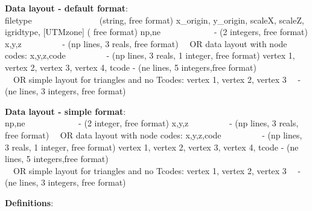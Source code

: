 \documentclass{article}
\begin{document}
\textbf{Data layout - default format}: \\ 

\noindent
filetype\ \ \ \ \ \ \ \ \ \ \ \ \ \ \ \ (string, free format) \newline
x\_origin, y\_origin, scaleX, scaleZ, igridtype,  [UTMzone] ( free format)\newline
np,ne \ \ \ \ \ \ \ \ \ \ \ \ {}- (2 integers, free format)\newline
x,y,z \ \ \ \ \ \ \ \ \ {}- (np lines, 3 reals, free format)\newline
\ \ OR data layout with node codes:\newline
x,y,z,code \ \ \ \ \ \ \ \ \ {}- (np lines, 3 reals, 1 integer, free format)\newline
vertex 1, vertex 2, vertex 3, vertex 4, tcode - (ne lines, 5 integers,free format) \\
\ \ OR simple layout for triangles and no Tcodes:\newline
vertex 1, vertex 2, vertex 3 \ \ {}- (ne lines, 3 integers, free format)\newline

\textbf{Data layout - simple format}: \\ 

\noindent
np,ne \ \ \ \ \ \ \ \ \ \ \ \ {}- (2 integer, free format)\newline
x,y,z \ \ \ \ \ \ \ \ \ {}- (np lines, 3 reals, free format)\newline
\ \ OR data layout with node codes:\newline
x,y,z,code \ \ \ \ \ \ \ \ \ {}- (np lines, 3 reals, 1 integer, free format)\newline
vertex 1, vertex 2, vertex 3, vertex 4, tcode - (ne lines, 5 integers,free format) \\
\ \ OR simple layout for triangles and no Tcodes:\newline
vertex 1, vertex 2, vertex 3 \ \ {}- (ne lines, 3 integers, free format)\newline

\noindent\textbf{Definitions}:\\ 
\end{document}
